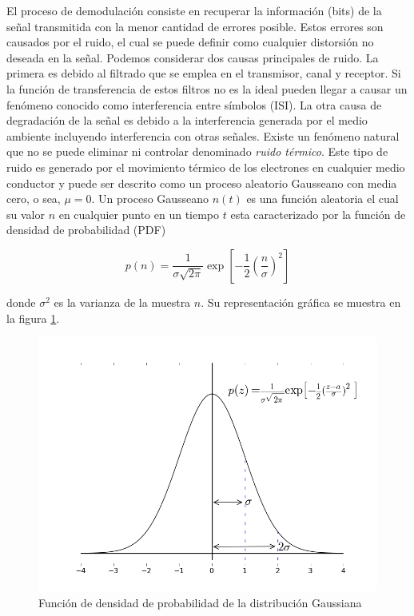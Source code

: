 El proceso de demodulaci\'on consiste en recuperar la informaci\'on (bits) de la se\~nal
transmitida con la menor cantidad de errores posible. Estos errores son causados por el ruido, el
cual se puede definir como cualquier distorsi\'on no deseada en la se\~nal. Podemos considerar dos
causas principales de ruido. La primera es debido al filtrado que se emplea en el transmisor, canal
y receptor. Si la funci\'on de transferencia de estos filtros no es la ideal pueden llegar a causar
un fen\'omeno conocido como interferencia entre s\'imbolos (ISI). La otra causa de degradaci\'on de
la se\~nal es debido a la interferencia generada por el medio ambiente incluyendo interferencia con
otras se\~nales. Existe un fen\'omeno natural que no se puede eliminar ni controlar denominado
\emph{ruido t\'ermico}. Este tipo de ruido es generado por el movimiento t\'ermico de los electrones
en cualquier medio conductor y puede ser descrito como un proceso aleatorio Gausseano con media cero, o sea, $\mu=0$. Un
proceso Gausseano $n(t)$ es una funci\'on aleatoria el cual su valor $n$ en cualquier punto en un tiempo $t$ esta
caracterizado por la funci\'on de densidad de probabilidad (PDF)

\begin{equation}\label{eq:gauss}
p(n)=\frac{1}{\sigma\sqrt{2\pi}}\exp\left[-\frac{1}{2}\left(\frac{n}{\sigma}\right)^2\right]
\end{equation}

donde $\sigma^2$ es la varianza de la muestra $n$. Su representaci\'on gr\'afica se muestra en la figura \ref{fig:gauss}.

\begin{figure}[ht]
\centering
	\includegraphics[width=5.5in]{figs/gauss}
	\caption{Funci\'on de densidad de probabilidad de la distribuci\'on Gaussiana}
	\label{fig:gauss}
\end{figure}

